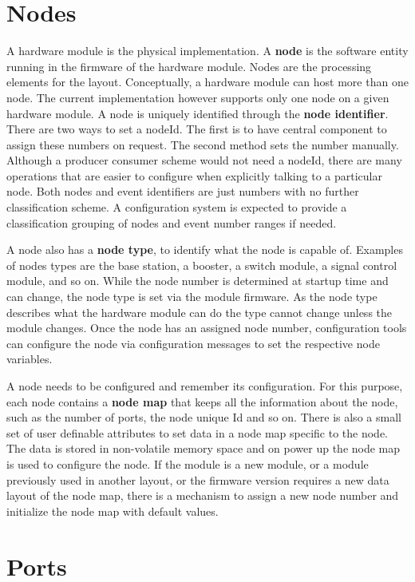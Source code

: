 \section{Nodes}

A hardware module is the physical implementation. A {\bf node} is the software entity running in the firmware of the hardware module. Nodes are the processing elements for the layout. Conceptually, a hardware module can host more than one node. The current implementation however supports only one node on a given hardware module. A node is uniquely identified through the {\bf node identifier}. There are two ways to set a nodeId. The first is to have central component to assign these numbers on request. The second method sets the number manually. Although a producer consumer scheme would not need a nodeId, there are many operations that are easier to configure when explicitly talking to a particular node. Both nodes and event identifiers are just numbers with no further classification scheme. A configuration system is expected to provide a classification grouping of nodes and event number ranges if needed.

A node also has a {\bf node type}, to identify what the node is capable of. Examples of nodes types are the base station, a booster, a switch module, a signal control module, and so on. While the node number is determined at startup time and can change, the node type is set via the module firmware. As the node type describes what the hardware module can do the type cannot change unless the module changes. Once the node has an assigned node number, configuration tools can configure the node via configuration messages to set the respective node variables.

A node needs to be configured and remember its configuration. For this purpose, each node contains a {\bf node map} that keeps all the information about the node, such as the number of ports, the node unique Id and so on. There is also a small set of user definable attributes to set data in a node map specific to the node. The data is stored in non-volatile memory space and on power up the node map is used to configure the node. If the module is a new module, or a module previously used in another layout, or the firmware version requires a new data layout of the node map, there is a mechanism to assign a new node number and initialize the node map with default values.

\section{Ports}

